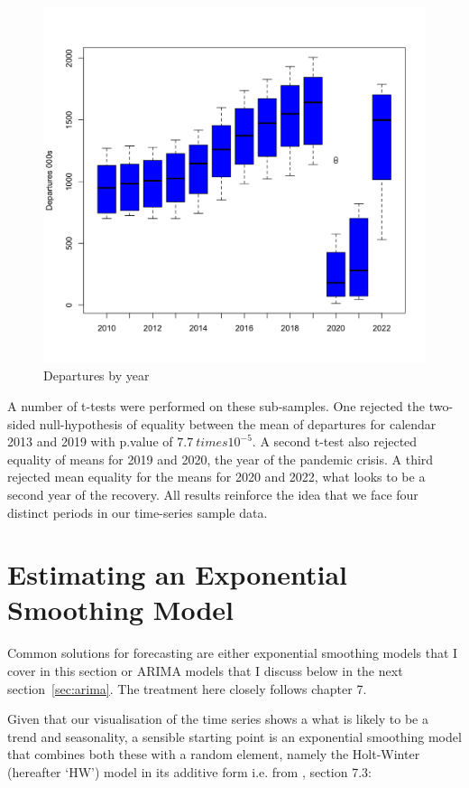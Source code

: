 \documentclass[9pt,technote]{IEEEtran}
\begin{document}
\begin{figure}[htbp]
\centerline{\includegraphics[scale=0.2]{boxplot2.png}}
\caption{Departures by year}
\label{fig:boxplot2}
\end{figure}

A number of t-tests were performed on these sub-samples.  One rejected the two-sided null-hypothesis of equality between the mean of departures for calendar 2013 and 2019 with p.value of $7.7 \ times 10^{-5}$. A second t-test also rejected equality of means for 2019 and 2020, the year of the pandemic crisis.  A third rejected mean equality for the means for 2020 and 2022, what looks to be a second year of the recovery.  All results reinforce the idea that we face four distinct periods in our time-series sample data.  

\section{Estimating an Exponential Smoothing Model}
\label{sec:exp}

Common solutions for forecasting are either exponential smoothing models that I cover in this section or ARIMA models that I discuss below in the next section~\ref{sec:arima}.  The treatment here closely follows \cite{fpp2} chapter 7.  

Given that our visualisation of the time series shows a what is likely to be a trend and seasonality, a sensible starting point is an exponential smoothing model that combines both these with a random element, namely the Holt-Winter (hereafter `HW') model in its additive form i.e. from \cite{fpp2}, section 7.3: 
\end{document}
